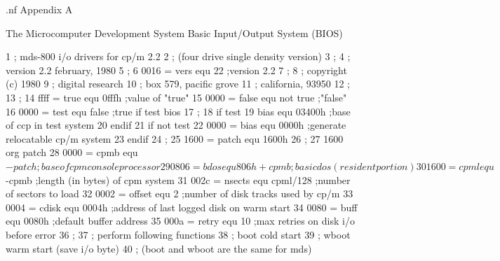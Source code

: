 .nf
                                                       Appendix A

                                         The Microcomputer Development System Basic Input/Output System (BIOS)



  1                       ;        mds-800 i/o drivers for cp/m 2.2
  2                       ;        (four drive single density version)
  3                       ;
  4                       ;        version 2.2 february, 1980
  5                       ;
  6      0016 =           vers     equ   22             ;version 2.2
  7                       ;
  8                       ;        copyright (c) 1980
  9                       ;        digital research
 10                       ;        box 579, pacific grove
 11                       ;        california, 93950
 12                       ;
 13                       ;
 14      ffff =           true     equ      0fffh      ;value of "true"
 15      0000 =           false    equ      not true   ;"false"
 16      0000 =           test     equ      false      ;true if test bios
 17                       ;
 18                                if       test
 19                       bias     equ      03400h     ;base of ccp in test system
 20                                endif
 21                                if       not test
 22      0000 =           bias     equ      0000h      ;generate relocatable cp/m system
 23                                endif
 24                       ;
 25      1600 =           patch    equ      1600h
 26                       ;
 27      1600                      org      patch
 28      0000 =           cpmb     equ      $-patch    ;base of cpm console processor
 29      0806 =           bdos     equ      806h+cpmb  ;basic dos (resident portion)
 30      1600 =           cpml     equ      $-cpmb     ;length (in bytes) of cpm system
 31      002c =           nsects   equ      cpml/128   ;number of sectors to load
 32      0002 =           offset   equ      2          ;number of disk tracks used by cp/m
 33      0004 =           cdisk    equ      0004h      ;address of last logged disk on warm start
 34      0080 =           buff     equ      0080h      ;default buffer address
 35      000a =           retry    equ      10         ;max retries on disk i/o before error
 36                       ;
 37                       ;        perform following functions
 38                       ;        boot     cold start
 39                       ;        wboot warm start (save i/o byte)
 40                       ;        (boot and wboot are the same for mds)
